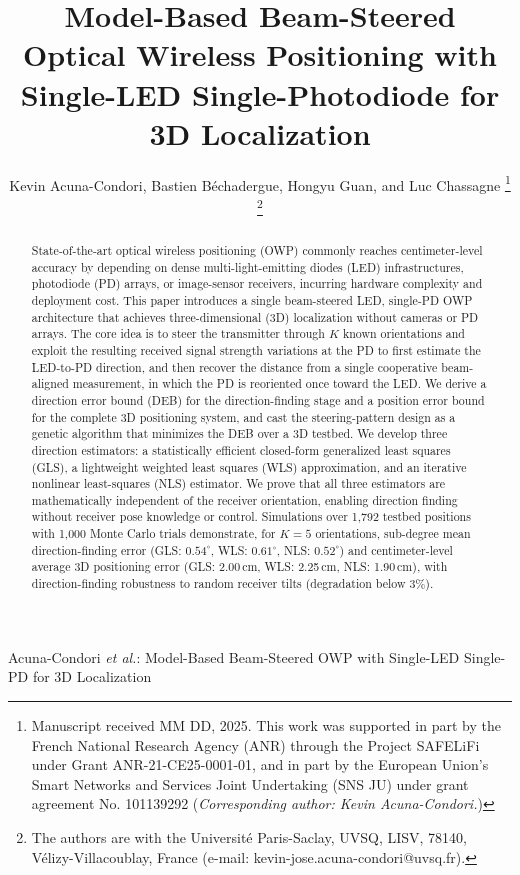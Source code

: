 \documentclass[journal]{IEEEtran}
\begin{document}

\title{Model-Based Beam-Steered Optical Wireless Positioning with Single-LED Single-Photodiode for 3D Localization}
\author{Kevin Acuna-Condori, Bastien Béchadergue, Hongyu Guan, and Luc Chassagne
\thanks{Manuscript received MM DD, 2025.
This work was supported in part by the French National Research Agency (ANR) through the Project SAFELiFi under Grant ANR-21-CE25-0001-01, and in part by the European Union's Smart Networks and Services Joint Undertaking (SNS JU) under grant agreement No. 101139292 (\textit{Corresponding author: Kevin Acuna-Condori.})
}
\thanks{
The authors are with the Université Paris-Saclay, UVSQ, LISV, 78140, Vélizy-Villacoublay, France (e-mail: kevin-jose.acuna-condori@uvsq.fr).
}
}
%
{Acuna-Condori \MakeLowercase{\textit{et al.}}: Model-Based Beam-Steered OWP with Single-LED Single-PD for 3D Localization}
\maketitle

\begin{abstract}
State-of-the-art optical wireless positioning (OWP) commonly reaches centimeter-level accuracy by depending on dense multi-light-emitting diodes (LED) infrastructures, photodiode (PD) arrays, or image-sensor receivers, incurring hardware complexity and deployment cost. 
This paper introduces a single beam-steered LED, single-PD OWP architecture that achieves three-dimensional (3D) localization without cameras or PD arrays. The core idea is to steer the transmitter through $K$ known orientations and exploit the resulting received signal strength variations at the PD to first estimate the LED-to-PD direction, and then recover the distance from a single cooperative beam-aligned measurement, in which the PD is reoriented once toward the LED. We derive a direction error bound (DEB) for the direction-finding stage and a position error bound for the complete 3D positioning system, and cast the steering-pattern design as a genetic algorithm that minimizes the DEB over a 3D testbed. We develop three direction estimators: a statistically efficient closed-form generalized least squares (GLS), a lightweight weighted least squares (WLS) approximation, and an iterative nonlinear least-squares (NLS) estimator. We prove that all three estimators are mathematically independent of the receiver orientation, enabling direction finding without receiver pose knowledge or control. Simulations over 1,792 testbed positions with 1,000 Monte Carlo trials demonstrate, for $K=5$ orientations, sub-degree mean direction-finding error (GLS: $0.54^\circ$, WLS: $0.61^\circ$, NLS: $0.52^\circ$) and centimeter-level average 3D positioning error (GLS: 2.00\,cm, WLS: 2.25\,cm, NLS: 1.90\,cm), with direction-finding robustness to random receiver tilts (degradation below 3\%).
\end{abstract}
\end{document}
